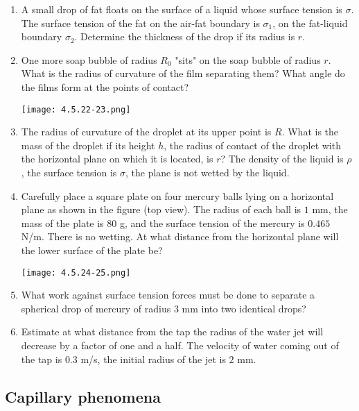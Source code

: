 \documentclass{article}
\begin{document}
\begin{enumerate}[label=4.5.\arabic*]
\item A small drop of fat floats on the surface of a liquid whose surface tension is $\sigma$. The surface tension of the fat on the air-fat boundary is $\sigma_1$, on the fat-liquid boundary $\sigma_2$. Determine the thickness of the drop if its radius is $r$. 

\item One more soap bubble of radius $R_0$ "sits" on the soap bubble of radius $r$. What is the radius of curvature of the film separating them? What angle do the films form at the points of contact?   

\begin{center}
    \texttt{[image: 4.5.22-23.png]}
\end{center}

\item The radius of curvature of the droplet at its upper point is $R$. What is the mass of the droplet if its height $h$, the radius of contact of the droplet with the horizontal plane on which it is located, is $r$? The density of the liquid is $\rho$, the surface tension is $\sigma$, the plane is not wetted by the liquid.

\item Carefully place a square plate on four mercury balls lying on a horizontal plane as shown in the figure (top view). The radius of each ball is $1$ mm, the mass of the plate is $80$ g, and the surface tension of the mercury is $0.465$ N/m. There is no wetting. At what distance from the horizontal plane will the lower surface of the plate be?

\begin{center}
    \texttt{[image: 4.5.24-25.png]}
\end{center}

\item What work against surface tension forces must be done to separate a spherical drop of mercury of radius $3$ mm into two identical drops?

\item Estimate at what distance from the tap the radius of the water jet will decrease by a factor of one and a half. The velocity of water coming out of the tap is $0.3$ m/s, the initial radius of the jet is $2$ mm.



\end{enumerate}

\subsection{Capillary phenomena}
\end{document}
